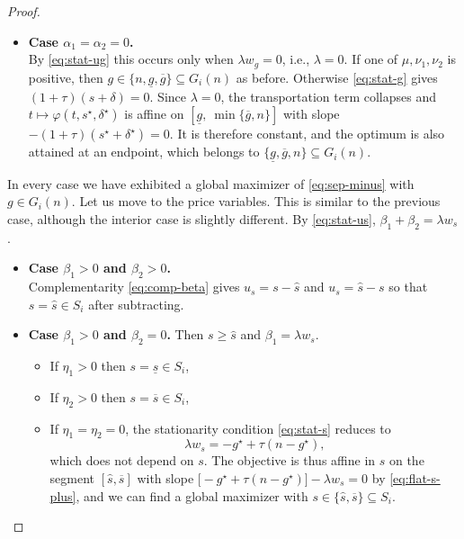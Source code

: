 \documentclass[11pt]{article}
\theoremstyle{plain}
\theoremstyle{definition}
\begin{document}
\begin{proof}
\begin{itemize}
    \item \textbf{Case $\alpha_1=\alpha_2=0$.}\\
    By \eqref{eq:stat-ug} this occurs only when $\lambda w_g=0$, i.e., $\lambda=0$. 
    If one of $\mu,\nu_1,\nu_2$ is positive, then $g\in\{n,\underline g,\overline g\}\subseteq G_i(n)$ as before. 
    Otherwise \eqref{eq:stat-g} gives $(1+\tau)(s+\delta)=0$.
    Since $\lambda=0$, the transportation term collapses and $t\mapsto\varphi(t,s^\star,\delta^\star)$ is affine on $[\underline g,\ \min\{\overline g,n\}]$ with slope $-(1+\tau)(s^\star+\delta^\star)=0$.
    It is therefore constant, and the optimum is also attained at an endpoint, which belongs to $\{\underline g,\overline g,n\}\subseteq G_i(n)$.
\end{itemize}

\noindent In every case we have exhibited a global maximizer of \eqref{eq:sep-minus} with $g\in G_i(n)$.
Let us move to the price variables.
This is similar to the previous case, although the interior case is slightly different.
By \eqref{eq:stat-us}, $\beta_1+\beta_2=\lambda w_s$.  

\begin{itemize}
    \item \textbf{Case $\beta_1>0$ and $\beta_2>0$.}\\
    Complementarity \eqref{eq:comp-beta} gives $u_s=s-\widehat s$ and $u_s=\widehat s-s$ so that $\boxed{s=\widehat s}\in S_i$ after subtracting.
 
    \item \textbf{Case $\beta_1>0$ and $\beta_2=0$.} Then $s\ge\widehat s$ and $\beta_1=\lambda w_s$. 
    \begin{itemize}
        \item If $\eta_1>0$ then $\boxed{s=\underline s}\in S_i$,
        \item If $\eta_2>0$ then $\boxed{s=\overline s}\in S_i$,
        \item If $\eta_1=\eta_2=0$, the stationarity condition \eqref{eq:stat-s} reduces to
        \begin{equation}
        \label{eq:flat-s-plus}
        \lambda w_s=-g^\star+\tau(n-g^\star),
    \end{equation}
    which does not depend on $s$. 
    The objective is thus affine in $s$ on the segment $[\widehat s,\overline s]$ with slope $\bigl[-g^\star+\tau(n-g^\star)\bigr]-\lambda w_s=0$ by \eqref{eq:flat-s-plus}, and we can find a global maximizer with $s\in\{\widehat s,\overline s\}\subseteq S_i$.
    \end{itemize}
 

\end{itemize}
\end{proof}
\end{document}
